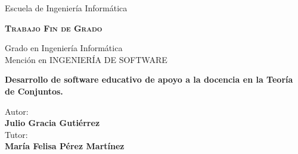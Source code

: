 \documentclass[openright,twoside,10pt]{book}
\begin{document}
{\begin{titlepage}
\begin{center}
            \vspace*{0.15in}
            \vspace*{0.6in}
            \begin{Huge}
                {Escuela de Ingeniería Informática\\}
            \end{Huge}
            \vspace*{0.2in}
            \begin{Large}
                \textbf{\textsc{Trabajo Fin de Grado\\}}
            \end{Large}
            \vspace*{0.5in}
            \begin{Large}
                { Grado en Ingeniería Informática}\\
                { Mención en INGENIERÍA DE SOFTWARE \\}
            \end{Large}
            \vspace*{0.5in}
            \vspace*{0.3in}
            \begin{large}
                \textbf{{\LARGE Desarrollo de software educativo de apoyo a la docencia en la Teoría de
Conjuntos.\\}}
            \end{large}
            \vspace*{0.3in}
            \vspace*{1.3in}
            \begin{large}
                \begin{flushright}
                    Autor:\\
                    \textbf{Julio Gracia Gutiérrez} \\
                    \vspace*{0.3in}
                    Tutor:\\
                    \textbf{María Felisa Pérez Martínez}
                \end{flushright}
            \end{large}
        \end{center}
    \end{titlepage}

    }
    
\end{document}
